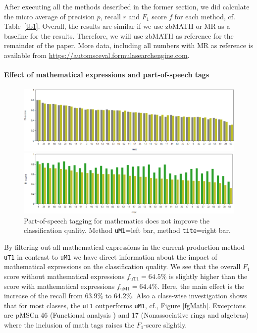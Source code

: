 After executing all the methods described in the former section, we did calculate the micro average of precision $p$, recall $r$ and $F_1$ score $f$ for each method, cf. Table~\ref{tb1}.
Overall, the results are similar if we use zbMATH or MR as a baseline for the results.
Therefore, we will use zbMATH as reference for the remainder of the paper.
More data, including all numbers with MR as reference is available from
\url{https://automsceval.formulasearchengine.com}.

\paragraph{Effect of mathematical expressions and part-of-speech tags}
\begin{figure}[ht]
  \centering
  \includegraphics[width=\textwidth]{mathEncoding.png}
  \caption{Mathematical symbols in \texttt{title} and abstract \texttt{text} do not improve the classification quality. Method \texttt{uT1} =left bar; method \texttt{uM1}=right bar%
 }\label{fgMath}
  \includegraphics[width=\textwidth]{POSeffekt.png}
\caption{Part-of-speech tagging for mathematics does not improve the classification quality. Method \texttt{uM1}=left bar, method \texttt{tite}=right bar.}\label{fgPOS}
\end{figure}
By filtering out all mathematical expressions in the current production method \texttt{uT1} in contrast to \texttt{uM1} we have direct information about the impact of mathematical expressions on the classification quality.
We see that the overall $F_1$ score without mathematical expressions $f_\mathrm{uT1}=64.5\%$ is slightly higher than the score with mathematical expressions $f_\mathrm{uM1}=64.4\%.$ 
Here, the main effect is the increase of the recall from  $63.9\%$ to $64.2\%.$
Also a class-wise investigation shows that for most classes, the \texttt{uT1} outperforms \texttt{uM1}, cf., Figure \ref{fgMath}.
Exceptions are pMSCn 46 (Functional analysis ) and 17 (Nonassociative rings and algebras) where the inclusion of math tags raises the $F_1$-score slightly.

